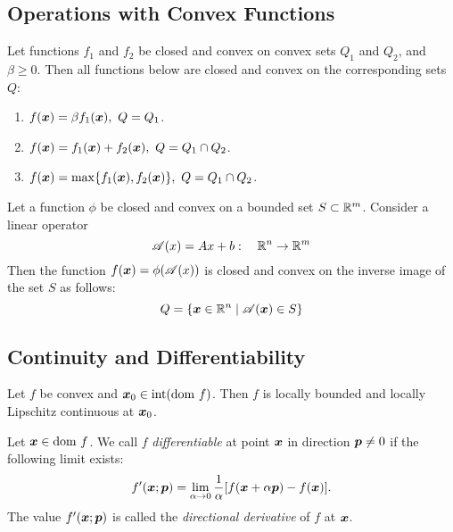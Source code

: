 \subsection{Operations with Convex Functions}\label{thm:operations-convex}
\begin{thm}
    Let functions \(f_1\) and \(f_2\) be closed and convex on convex sets \(Q_1\) and \(Q_2\), and \(\beta \ge 0\).
    Then all functions below are closed and convex on the corresponding sets \(Q\):
    \begin{enumerate}
        \item \(f(\bm{x}) = \beta f_1 (\bm{x}),~Q = Q_1\).
        \item \(f(\bm{x}) = f_1(\bm{x}) + f_2(\bm{x}),~Q = Q_1 \cap Q_2\).
        \item \(f(\bm{x}) = \max\{f_1(\bm{x}), f_2(\bm{x})\},~Q = Q_1 \cap Q_2\).
    \end{enumerate}
\end{thm}

\begin{thm}
    Let a function \(\phi\) be closed and convex on a bounded set \(S \subset \mathbb{R}^m\). Consider a linear operator
    \[
        \mathscr{A}(x) = Ax + b: \quad \mathbb{R}^n \to \mathbb{R}^m  
    \]
    Then the function \(f(\bm{x}) = \phi(\mathscr{A}(x))\) is closed and convex on the inverse image of the set \(S\) as follows:
    \[
        Q = \{ \bm{x} \in \mathbb{R}^n \mid \mathscr{A}(\bm{x}) \in S \}    
    \]
\end{thm}

\subsection{Continuity and Differentiability}\label{subsec:Continuity-and-Differentiability}
\begin{thm}
    Let \(f\) be convex and \(\bm{x}_0 \in \mathrm{int}(\mathrm{dom}~ f)\). Then \(f\) is locally bounded
    and locally Lipschitz continuous at \(\bm{x}_0\).
\end{thm}

\begin{defn}
    Let \(\bm{x} \in \mathrm{dom}~ f\). We call \(f\) \emph{differentiable} at point \(\bm{x}\) in direction \(\bm{p} \ne 0\)
    if the following limit exists:
    \begin{equation}
        f'(\bm{x}; \bm{p}) = \lim_{\alpha \to 0} \frac{1}{\alpha} [f(\bm{x} + \alpha \bm{p}) - f(\bm{x})].
    \end{equation}
    The value \(f'(\bm{x}; \bm{p})\) is called the \emph{directional derivative} of \(f\) at \(\bm{x}\).
\end{defn}

